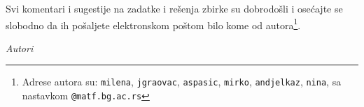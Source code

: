 Svi komentari i sugestije na zadatke i rešenja zbirke su dobrodošli i osećajte se slobodno da ih pošaljete elektronskom poštom bilo kome od autora\footnote{Adrese autora su: \texttt{milena}, \texttt{jgraovac}, \texttt{aspasic}, \texttt{mirko}, \texttt{andjelkaz}, \texttt{nina}, sa nastavkom \texttt{@matf.bg.ac.rs}}. 





\bigskip

\begin{flushright}
{\em Autori}
\end{flushright}
